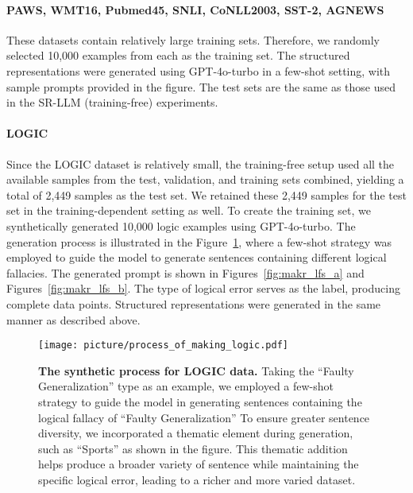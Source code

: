 \paragraph{PAWS, WMT16, Pubmed45, SNLI, CoNLL2003, SST-2, AGNEWS}
These datasets contain relatively large training sets. Therefore, we randomly selected 10,000 examples from each as the training set. The structured representations were generated using GPT-4o-turbo in a few-shot setting, with sample prompts provided in the figure. The test sets are the same as those used in the SR-LLM (training-free) experiments.

\paragraph{LOGIC}
Since the LOGIC dataset is relatively small, the training-free setup used all the available samples from the test, validation, and training sets combined, yielding a total of 2,449 samples as the test set. We retained these 2,449 samples for the test set in the training-dependent setting as well. To create the training set, we synthetically generated 10,000 logic examples using GPT-4o-turbo. The generation process is illustrated in the Figure~\ref{fig:process_of_making_logic}, where a few-shot strategy was employed to guide the model to generate sentences containing different logical fallacies. The generated prompt is shown in Figures~\ref{fig:makr_lfs_a} and Figures~\ref{fig:makr_lfs_b}. The type of logical error serves as the label, producing complete data points. Structured representations were generated in the same manner as described above.

\begin{figure}[ht]
\centering
\vspace{0in}
\texttt{[image: picture/process\_of\_making\_logic.pdf]}
\caption{\textbf{The synthetic process for LOGIC data.} Taking the ``Faulty Generalization'' type as an example, we employed a few-shot strategy to guide the model in generating sentences containing the logical fallacy of ``Faulty Generalization'' To ensure greater sentence diversity, we incorporated a thematic element during generation, such as ``Sports'' as shown in the figure. This thematic addition helps produce a broader variety of sentence while maintaining the specific logical error, leading to a richer and more varied dataset.}
\label{fig:process_of_making_logic}
\vspace{-0.1in}
\end{figure}

